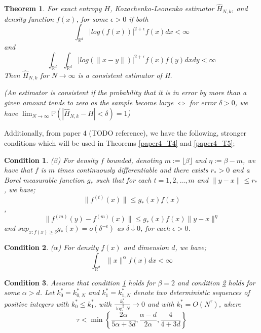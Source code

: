 \documentclass{article}
\newtheorem{theorem}{Theorem}
\newtheorem{remark}{Condition}
\begin{document}
\begin{theorem} \label{paper1_T2}
For exact entropy $H$, Kozachenko-Leonenko estimator $\hat{H}_{N,k}$, and density function $f(x)$, for some $\epsilon > 0$ if both
\begin{equation} \label{paper1_T2_eq1}
\int_{\mathbb{R}^{d}} | log(f(x))|^{2 + \epsilon} f(x) dx < \infty \nonumber
\end{equation}
and
\begin{equation} \label{paper1_T2_eq2}
\int_{\mathbb{R}^{d}} \int_{\mathbb{R}^{d}} | log(\|x-y\|)|^{2+ \epsilon} f(x) f(y) dx dy < \infty \nonumber
\end{equation}
Then $\hat{H}_{N, k}$ for $N \to \infty$ is a consistent estimator of H.

(An estimator is consistent if the probability that it is in error by more than a given amount tends to zero as the sample become large $\Leftrightarrow $ for error $\delta > 0$, we have $\lim_{N \to \infty} \mathbb{P}(|\hat{H}_{N,k} - H| < \delta) = 1$) 
\end{theorem}

Additionally, from paper 4 (TODO reference), we have the following, stronger conditions which will be used in Theorems \ref{paper4_T4} and \ref{paper4_T5};
\begin{remark} ($\beta$) \label{A1}
For density $f$ bounded, denoting $m := \lfloor \beta \rfloor$ and $\eta := \beta -m$, we have that $f$ is $m$ times continuously differentiable and there exists $r_{*} > 0$ and a Borel measurable function $g_{*}$ such that for each $t = 1, 2, ... , m$ and $\|y-x\| \leq r_{*}$, we have;
\begin{equation}
\| f^{(t)} (x) \| \leq g_{*}(x)f(x) \nonumber
\end{equation},
\begin{equation}
\| f^{(m)} (y) - f^{(m)} (x) \| \leq g_{*}(x)f(x) \|y-x\|^{\eta} \nonumber
\end{equation}
and $sup_{x:f(x)\geq \delta} g_{*}(x) = o(\delta^{-\epsilon})$ as $\delta \downarrow 0$, for each $\epsilon > 0$.
\end{remark}

\begin{remark} ($\alpha$) \label{A2}
For density $f(x)$ and dimension $d$, we have;
\begin{equation}
\int_{\mathbb{R}^{d}} \| x \|^{\alpha} f(x) dx < \infty \nonumber
\end{equation}
\end{remark}

\begin{remark} \label{A3}
Assume that condition \ref{A1} holds for $\beta = 2$ and condition \ref{A2} holds for some $\alpha > d$. Let $k_{0}^{*} = k_{0, N}^{*}$ and $k_{1}^{*} = k_{1, N}^{*}$ denote two deterministic sequences of positive integers with $k_{0}^{*} \leq k_{1}^{*}$, with $\frac{k_{0}^{*}}{\log^{5}{N}} \to 0$ and with $k_{1}^{*} = O(N^{\tau})$, where
\begin{equation}
\tau < \min \left\{ \frac{2 \alpha}{5 \alpha + 3d} , \frac{\alpha - d}{2 \alpha} , \frac{4}{4 + 3d} \right\} \nonumber
\end{equation}
\end{remark}
\end{document}
